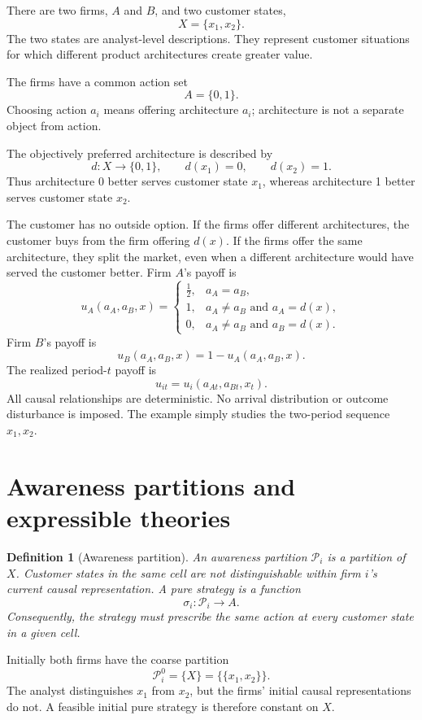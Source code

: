 \documentclass[11pt]{article}
\newtheorem{definition}{Definition}
\begin{document}
There are two firms, $A$ and $B$, and two customer states,
\[
X=\{x_1,x_2\}.
\]
The two states are analyst-level descriptions.  They represent customer situations for which different product architectures create greater value.

The firms have a common action set
\[
A=\{0,1\}.
\]
Choosing action $a_i$ means offering architecture $a_i$; architecture is not a separate object from action.

The objectively preferred architecture is described by
\[
d:X\longrightarrow\{0,1\},
\qquad
d(x_1)=0,
\qquad
d(x_2)=1.
\]
Thus architecture 0 better serves customer state $x_1$, whereas architecture 1 better serves customer state $x_2$.

The customer has no outside option.  If the firms offer different architectures, the customer buys from the firm offering $d(x)$.  If the firms offer the same architecture, they split the market, even when a different architecture would have served the customer better.  Firm $A$'s payoff is
\begin{equation}
u_A(a_A,a_B,x)=
\begin{cases}
\frac12, & a_A=a_B,\\
1, & a_A\neq a_B\text{ and }a_A=d(x),\\
0, & a_A\neq a_B\text{ and }a_B=d(x).
\end{cases}
\label{eq:objective-payoff}
\end{equation}
Firm $B$'s payoff is
\[
u_B(a_A,a_B,x)=1-u_A(a_A,a_B,x).
\]
The realized period-$t$ payoff is
\[
u_{it}=u_i(a_{At},a_{Bt},x_t).
\]
All causal relationships are deterministic.  No arrival distribution or outcome disturbance is imposed.  The example simply studies the two-period sequence $x_1,x_2$.

\section{Awareness partitions and expressible theories}

\begin{definition}[Awareness partition]
An awareness partition $\mathcal P_i$ is a partition of $X$.  Customer states in the same cell are not distinguishable within firm $i$'s current causal representation.  A pure strategy is a function
\[
\sigma_i:\mathcal P_i\longrightarrow A.
\]
Consequently, the strategy must prescribe the same action at every customer state in a given cell.
\end{definition}

Initially both firms have the coarse partition
\[
\mathcal P_i^0=\{X\}=\big\{\{x_1,x_2\}\big\}.
\]
The analyst distinguishes $x_1$ from $x_2$, but the firms' initial causal representations do not.  A feasible initial pure strategy is therefore constant on $X$.
\end{document}
